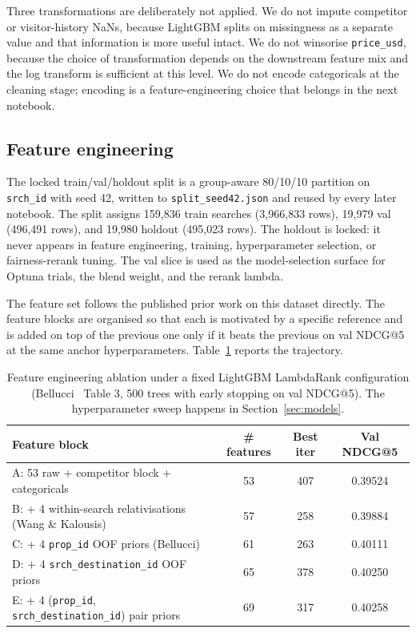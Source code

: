 Three transformations are deliberately not applied. We do not impute competitor or visitor-history NaNs, because LightGBM splits on missingness as a separate value and that information is more useful intact. We do not winsorise \texttt{price\_usd}, because the choice of transformation depends on the downstream feature mix and the log transform is sufficient at this level. We do not encode categoricals at the cleaning stage; encoding is a feature-engineering choice that belongs in the next notebook.

\subsection{Feature engineering}\label{subsec:feat}

The locked train/val/holdout split is a group-aware 80/10/10 partition on \texttt{srch\_id} with seed 42, written to \texttt{split\_seed42.json} and reused by every later notebook. The split assigns 159{,}836 train searches (3{,}966{,}833 rows), 19{,}979 val (496{,}491 rows), and 19{,}980 holdout (495{,}023 rows). The holdout is locked: it never appears in feature engineering, training, hyperparameter selection, or fairness-rerank tuning. The val slice is used as the model-selection surface for Optuna trials, the blend weight, and the rerank lambda.

The feature set follows the published prior work on this dataset directly. The feature blocks are organised so that each is motivated by a specific reference and is added on top of the previous one only if it beats the previous on val NDCG@5 at the same anchor hyperparameters. Table~\ref{tab:fe} reports the trajectory.

\begin{table}[t]
\centering
\caption{Feature engineering ablation under a fixed LightGBM LambdaRank configuration (Bellucci~\cite{bellucci2021dmt} Table 3, 500 trees with early stopping on val NDCG@5). The hyperparameter sweep happens in Section~\ref{sec:models}.}
\label{tab:fe}
\begin{tabular}{lccc}
\toprule
Feature block & \# features & Best iter & Val NDCG@5 \\
\midrule
A: 53 raw + competitor block + categoricals & 53 & 407 & 0.39524 \\
B: + 4 within-search relativisations (Wang \& Kalousis) & 57 & 258 & 0.39884 \\
C: + 4 \texttt{prop\_id} OOF priors (Bellucci) & 61 & 263 & 0.40111 \\
D: + 4 \texttt{srch\_destination\_id} OOF priors & 65 & 378 & 0.40250 \\
E: + 4 (\texttt{prop\_id}, \texttt{srch\_destination\_id}) pair priors & 69 & 317 & 0.40258 \\
\bottomrule
\end{tabular}
\end{table}

